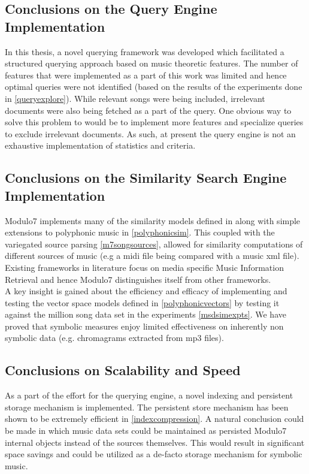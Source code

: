 \subsection{Conclusions on the Query Engine Implementation}

\noindent In this thesis, a novel querying framework was developed which facilitated a structured querying approach based on music theoretic features. The number of features that were implemented as a part of this work was limited and hence optimal queries were not identified (based on the results of the experiments done in \ref{queryexplore}). While relevant songs were being included, irrelevant documents were also being fetched as a part of the query. One obvious way to solve this problem to would be to implement more features and specialize queries to exclude irrelevant documents. As such, at present the query engine is not an exhaustive implementation of statistics and criteria.  

\subsection{Conclusions on the Similarity Search Engine Implementation}

\noindent Modulo7 implements many of the similarity models defined in \cite{similietechnicalmanual} along with simple extensions to polyphonic music in \ref{polyphonicsim}. This coupled with the variegated source parsing \ref{m7songsources}, allowed for similarity computations of different sources of music (e.g a midi file being compared with a music xml file). Existing frameworks in literature \cite{jMIR, marsyas, similie, humdrum}  focus on media specific Music Information Retrieval and hence Modulo7 distinguishes itself from other frameworks. \\

\noindent A key insight is gained about the efficiency and efficacy of  implementing and testing the vector space models defined in  \ref{polyphonicvectors} by testing it against the million song data set\cite{msd} in the experiments \ref{msdsimexpts}. We have proved that symbolic measures enjoy limited effectiveness on inherently non symbolic data (e.g. chromagrams extracted from mp3 files). 

\subsection{Conclusions on Scalability and Speed}

\noindent As a part of the effort for the querying engine, a novel indexing and persistent storage mechanism is implemented. The persistent store mechanism has been shown to be extremely efficient in \ref{indexcompression}. A natural conclusion could be made in which music data sets could be maintained as persisted Modulo7 internal objects instead of the sources themselves. This would result in significant space savings and could be utilized as a de-facto storage mechanism for symbolic music. \\


